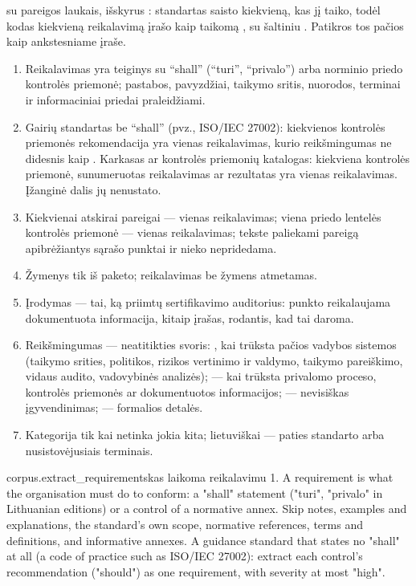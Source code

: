   su pareigos laukais, išskyrus
: standartas saisto kiekvieną, kas jį taiko, todėl kodas kiekvieną reikalavimą
įrašo kaip taikomą , su šaltiniu . Patikros tos pačios kaip
ankstesniame įraše.

\begin{enumerate}[itemsep=1pt, topsep=3pt]
  \item Reikalavimas yra teiginys su \enquote{shall} (\enquote{turi}, \enquote{privalo}) arba
    norminio priedo kontrolės priemonė; pastabos, pavyzdžiai, taikymo sritis, nuorodos,
    terminai ir informaciniai priedai praleidžiami.
  \item Gairių standartas be \enquote{shall} (pvz., ISO/IEC 27002): kiekvienos kontrolės
    priemonės rekomendacija yra vienas reikalavimas, kurio reikšmingumas ne didesnis kaip
    . Karkasas ar kontrolės priemonių katalogas: kiekviena kontrolės priemonė,
    sunumeruotas reikalavimas ar rezultatas yra vienas reikalavimas. Įžanginė dalis jų
    nenustato.
  \item Kiekvienai atskirai pareigai --- vienas reikalavimas; viena priedo lentelės kontrolės
    priemonė --- vienas reikalavimas; tekste paliekami pareigą apibrėžiantys sąrašo punktai ir
    nieko nepridedama.
  \item Žymenys tik iš paketo; reikalavimas be žymens atmetamas.
  \item Įrodymas --- tai, ką priimtų sertifikavimo auditorius: punkto reikalaujama
    dokumentuota informacija, kitaip įrašas, rodantis, kad tai daroma.
  \item Reikšmingumas --- neatitikties svoris: , kai trūksta pačios vadybos
    sistemos (taikymo srities, politikos, rizikos vertinimo ir valdymo, taikymo pareiškimo,
    vidaus audito, vadovybinės analizės);  --- kai trūksta privalomo proceso,
    kontrolės priemonės ar dokumentuotos informacijos;  --- nevisiškas įgyvendinimas;
     --- formalios detalės.
  \item Kategorija  tik kai netinka jokia kita; lietuviškai --- paties standarto
    arba nusistovėjusiais terminais.
\end{enumerate}

\par\nopagebreak
\begin{promptexcerpt}{corpus.extract_requirements}{kas laikoma reikalavimu}
1. A requirement is what the organisation must do to conform: a "shall"
   statement ("turi", "privalo" in Lithuanian editions) or a control of a
   normative annex. Skip notes, examples and explanations, the standard's own
   scope, normative references, terms and definitions, and informative
   annexes. A guidance standard that states no "shall" at all (a code of
   practice such as ISO/IEC 27002): extract each control's recommendation
   ("should") as one requirement, with severity at most "high".
\end{promptexcerpt}

